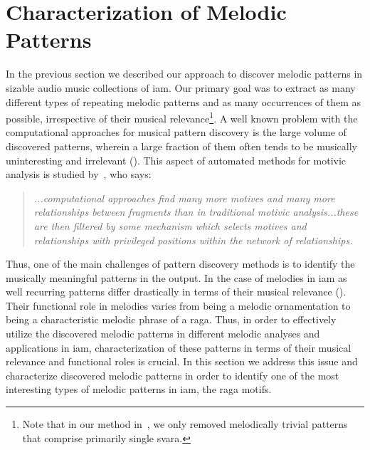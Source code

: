

\section{Characterization of Melodic Patterns}
\label{sec:patterns_characterization_of_melodic_patterns}

In the previous section we described our approach to discover melodic patterns in sizable audio music collections of \gls{iam}. Our primary goal was to extract as many different types of repeating melodic patterns and as many occurrences of them as possible, irrespective of their musical relevance\footnote{Note that in our method in~, we only removed melodically trivial patterns that comprise primarily single \gls{svara}.}. A well known problem with the computational approaches for musical pattern discovery is the large volume of discovered patterns, wherein a large fraction of them often tends to be musically uninteresting and irrelevant (). This aspect of automated methods for motivic analysis is studied by~\cite{marsden2012counselling}, who says:
\blockquote{\textit{...computational approaches find many more motives and many more relationships between fragments than in traditional motivic analysis...these are then filtered by some mechanism which selects motives and relationships with privileged positions within the network of relationships.}}

Thus, one of the main challenges of pattern discovery methods is to identify the musically meaningful patterns in the output. In the case of melodies in \gls{iam} as well recurring patterns differ drastically in terms of their musical relevance (). Their functional role in melodies varies from being a melodic ornamentation to being a characteristic melodic phrase of a \gls{raga}. Thus, in order to effectively utilize the discovered melodic patterns in different melodic analyses and applications in \gls{iam}, characterization of these patterns in terms of their musical relevance and functional roles is crucial. In this section we address this issue and characterize discovered melodic patterns in order to identify one of the most interesting types of melodic patterns in \gls{iam}, the \gls{raga} motifs.
 
